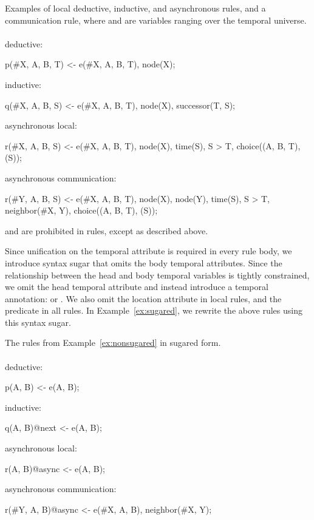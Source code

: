 \begin{example}
\label{ex:nonsugared}
Examples of local deductive, inductive, and asynchronous rules, and a communication rule, where  and  are variables ranging over the temporal universe.
\\\\
deductive:\\
\begin{Dedalus}
p(#X, A, B, T) <- e(#X, A, B, T), node(X);
\end{Dedalus}
inductive:\\
\begin{Dedalus}
q(#X, A, B, S) <- e(#X, A, B, T), node(X),
                  successor(T, S);
\end{Dedalus}
asynchronous local:\\
\begin{Dedalus}
r(#X, A, B, S) <- e(#X, A, B, T), node(X), time(S),
                  S > T, choice((A, B, T), (S));
\end{Dedalus}
asynchronous communication:\\
\begin{Dedalus}
r(#Y, A, B, S) <- e(#X, A, B, T), node(X), node(Y),
                  time(S), S > T, neighbor(#X, Y),
                  choice((A, B, T), (S));
\end{Dedalus}
\end{example}

 and  are prohibited in rules, except as described above.

Since unification on the temporal attribute is required in every rule body,
we introduce syntax sugar that omits the body temporal attributes.  Since the relationship between the head and body temporal variables is tightly constrained, we omit the head temporal attribute and instead introduce a temporal annotation:  or .  We also omit the location attribute in local rules, and the  predicate in all rules.  In Example~\ref{ex:sugared}, we rewrite the above rules using this syntax sugar.

\begin{example}
\label{ex:sugared}
The rules from Example~\ref{ex:nonsugared} in sugared form.
\\\\
deductive:\\
\begin{Dedalus}
p(A, B) <- e(A, B);
\end{Dedalus}
inductive:\\
\begin{Dedalus}
q(A, B)@next <- e(A, B);
\end{Dedalus}
asynchronous local:\\
\begin{Dedalus}
r(A, B)@async <- e(A, B);
\end{Dedalus}
asynchronous communication:\\
\begin{Dedalus}
r(#Y, A, B)@async <- e(#X, A, B), neighbor(#X, Y);
\end{Dedalus}
\end{example}

